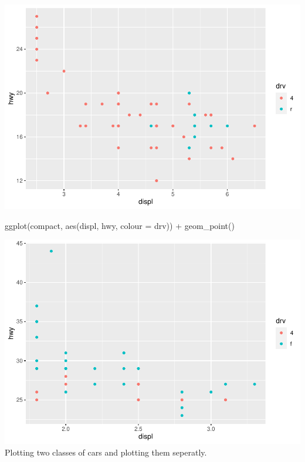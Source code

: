 \documentclass[
]{article}
\newenvironment{Shaded}{\begin{snugshade}}{\end{snugshade}}
\newcommand{\AttributeTok}[1]{\textcolor[rgb]{0.77,0.63,0.00}{#1}}
\newcommand{\FunctionTok}[1]{\textcolor[rgb]{0.00,0.00,0.00}{#1}}
\newcommand{\NormalTok}[1]{#1}
\newcommand{\SpecialCharTok}[1]{\textcolor[rgb]{0.00,0.00,0.00}{#1}}
\begin{document}
\includegraphics{Assignments_files/figure-latex/unnamed-chunk-70-1.pdf}

\begin{Shaded}
\begin{Highlighting}[]
\FunctionTok{ggplot}\NormalTok{(compact, }\FunctionTok{aes}\NormalTok{(displ, hwy, }\AttributeTok{colour =}\NormalTok{ drv)) }\SpecialCharTok{+}
  \FunctionTok{geom\_point}\NormalTok{()}
\end{Highlighting}
\end{Shaded}

\includegraphics{Assignments_files/figure-latex/unnamed-chunk-70-2.pdf}
Plotting two classes of cars and plotting them seperatly.
\end{document}
